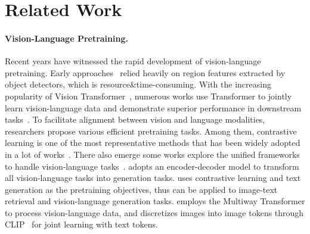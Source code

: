 \section{Related Work}
\label{sec:related-work}

\paragraph{Vision-Language Pretraining.}
Recent years have witnessed the rapid development of vision-language pretraining. 
Early approaches~\cite{vlbert,vilbert,visualbert,uniter,interbert,oscar,vinvl,unimo,vlt5,m6} relied heavily on region features extracted by object detectors, which is resource\&time-consuming. 
With the increasing popularity of Vision Transformer~\cite{vit}, numerous works use Transformer to jointly learn vision-language data and demonstrate superior performance in downstream tasks~\cite{vilt,albef,meter,vlmo,fiber,lemon,blip,blip2,mplug2}. 
To facilitate alignment between vision and language modalities, researchers propose various efficient pretraining tasks.
Among them, contrastive learning is one of the most representative methods that has been widely adopted in a lot of works~\cite{clip,align,lit,florence,simclr,moco,albef,chinese_clip}.
There also emerge some works explore the unified frameworks to handle vision-language tasks~\cite{ofa,simvlm,git,uni-perceiver,flava,coca,beit3,pali,metalm,unified_io}. \cite{ofa} adopts an encoder-decoder model to transform all vision-language tasks into generation tasks. 
\cite{coca} uses contrastive learning and text generation as the pretraining objectives, thus can be applied to image-text retrieval and vision-language generation tasks. 
\cite{beit3} employs the Multiway Transformer to process vision-language data, and discretizes images into image tokens through CLIP~\cite{clip} for joint learning with text tokens.

